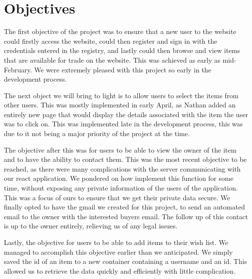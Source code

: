 \section{Objectives}
The first objective of the project was to ensure that a new user to the website could firstly access the website, could then register and sign in with the credentials entered in the registry, and lastly could then browse and view items that are available for trade on the website. This was achieved as early as mid-February. We were extremely pleased with this project so early in the development process. \par
The next object we will bring to light is to allow users to select the items from other users. This was mostly implemented in early April, as Nathan added an entirely new page that would display the details associated with the item the user was to click on. This was implemented late in the development process, this was due to it not being a major priority of the project at the time. \par
The objective after this was for users to be able to view the owner of the item and to have the ability to contact them. This was the most recent objective to be reached, as there were many complications with the server communicating with our react application. We pondered on how implement this function for some time, without exposing any private information of the users of the application. This was a focus of ours to ensure that we get their private data secure. We finally opted to have the gmail we created for this project, to send an automated email to the owner with the interested buyers email. The follow up of this contact is up to the owner entirely, relieving us of any legal issues. \par
Lastly, the objective for users to be able to add items to their wish list. We managed to accomplish this objective earlier than we anticipated. We simply saved the id of an item to a new container containing a username and an id. This allowed us to retrieve the data quickly and efficiently with little complication. \par

